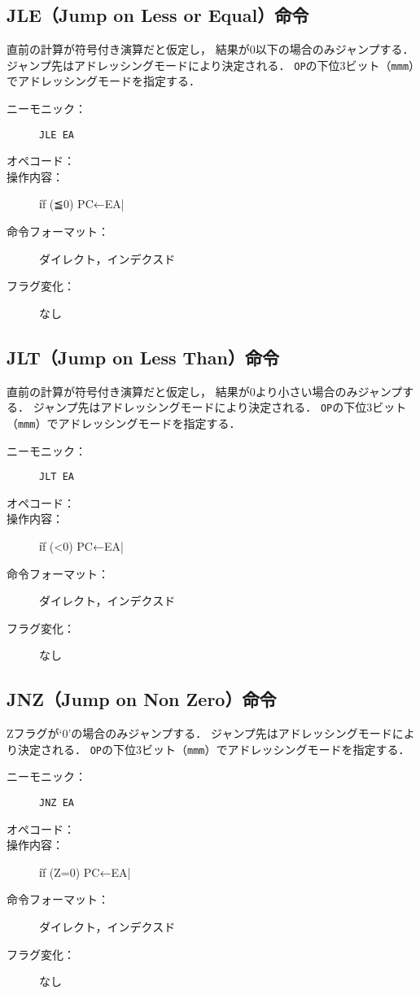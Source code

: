 \subsection{JLE（Jump on Less or Equal）命令}
直前の計算が符号付き演算だと仮定し，
結果が0以下の場合のみジャンプする．
ジャンプ先はアドレッシングモードにより決定される．
\texttt{OP}の下位3ビット（\texttt{mmm}）でアドレッシングモードを指定する．

\begin{description}
\item[ニーモニック：] \texttt{JLE EA}
\item[オペコード：] 
\item[操作内容：] \|if (≦0) PC←EA|
\item[命令フォーマット：] ダイレクト，インデクスド
\item[フラグ変化：] なし
\end{description}

\subsection{JLT（Jump on Less Than）命令}
直前の計算が符号付き演算だと仮定し，
結果が0より小さい場合のみジャンプする．
ジャンプ先はアドレッシングモードにより決定される．
\texttt{OP}の下位3ビット（\texttt{mmm}）でアドレッシングモードを指定する．

\begin{description}
\item[ニーモニック：] \texttt{JLT EA}
\item[オペコード：] 
\item[操作内容：] \|if (<0) PC←EA|
\item[命令フォーマット：] ダイレクト，インデクスド
\item[フラグ変化：] なし
\end{description}

\subsection{JNZ（Jump on Non Zero）命令}
Zフラグが`0'の場合のみジャンプする．
ジャンプ先はアドレッシングモードにより決定される．
\texttt{OP}の下位3ビット（\texttt{mmm}）でアドレッシングモードを指定する．

\begin{description}
\item[ニーモニック：] \texttt{JNZ EA}
\item[オペコード：] 
\item[操作内容：] \|if (Z=0) PC←EA|
\item[命令フォーマット：] ダイレクト，インデクスド
\item[フラグ変化：] なし
\end{description}


